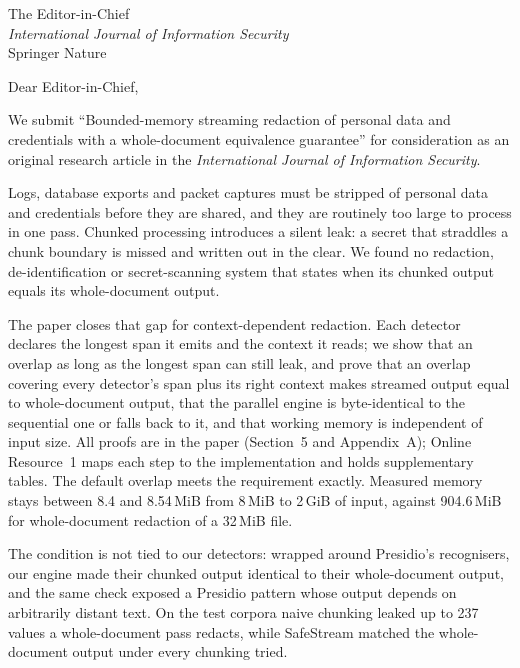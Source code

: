 \documentclass[10pt]{letter}
\date{\today}
\begin{document}
\begin{letter}{The Editor-in-Chief\\ \emph{International Journal of Information Security}\\ Springer Nature}

\opening{Dear Editor-in-Chief,}

We submit ``Bounded-memory streaming redaction of personal data and credentials with a whole-document equivalence guarantee'' for consideration as an original research article in the \emph{International Journal of Information Security}.

Logs, database exports and packet captures must be stripped of personal data and credentials before they are shared, and they are routinely too large to process in one pass. Chunked processing introduces a silent leak: a secret that straddles a chunk boundary is missed and written out in the clear. We found no redaction, de-identification or secret-scanning system that states when its chunked output equals its whole-document output.

The paper closes that gap for context-dependent redaction. Each detector declares the longest span it emits and the context it reads; we show that an overlap as long as the longest span can still leak, and prove that an overlap covering every detector's span plus its right context makes streamed output equal to whole-document output, that the parallel engine is byte-identical to the sequential one or falls back to it, and that working memory is independent of input size. All proofs are in the paper (Section~5 and Appendix~A); Online Resource~1 maps each step to the implementation and holds supplementary tables. The default overlap meets the requirement exactly. Measured memory stays between 8.4 and 8.54\,MiB from 8\,MiB to 2\,GiB of input, against 904.6\,MiB for whole-document redaction of a 32\,MiB file.

The condition is not tied to our detectors: wrapped around Presidio's recognisers, our engine made their chunked output identical to their whole-document output, and the same check exposed a Presidio pattern whose output depends on arbitrarily distant text. On the test corpora naive chunking leaked up to 237 values a whole-document pass redacts, while SafeStream matched the whole-document output under every chunking tried.


\end{letter}
\end{document}
